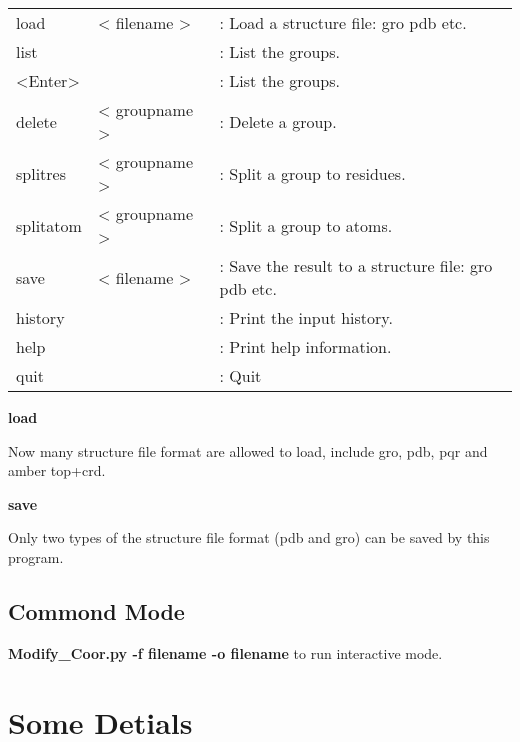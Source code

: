 \documentclass[letterpaper,10pt,english]{sphinxmanual}
\begin{document}
\begin{tabulary}{\linewidth}{|L|L|L|}
\hline

load
 & 
\textless{} filename \textgreater{}
 & 
: Load a structure file: gro pdb etc.
\\

list
 &  & 
: List the groups.
\\

\textless{}Enter\textgreater{}
 &  & 
: List the groups.
\\

delete
 & 
\textless{} groupname \textgreater{}
 & 
: Delete a group.
\\

splitres
 & 
\textless{} groupname \textgreater{}
 & 
: Split a group to residues.
\\

splitatom
 & 
\textless{} groupname \textgreater{}
 & 
: Split a group to atoms.
\\

save
 & 
\textless{} filename \textgreater{}
 & 
: Save the result to a structure file: gro pdb etc.
\\

history
 &  & 
: Print the input history.
\\

help
 &  & 
: Print help information.
\\

quit
 &  & 
: Quit
\\
\hline
\end{tabulary}


\textbf{load}

Now many structure file format are allowed to load, include gro, pdb, pqr and amber top+crd.

\textbf{save}

Only two types of the structure file format (pdb and gro) can be saved by this program.


\subsection{Commond Mode}
\label{documentation_pages/Modify_Coor:commond-mode}
\textbf{Modify\_Coor.py -f filename -o filename} to run interactive mode.


\section{Some Detials}
\label{documentation_pages/Modify_Coor:some-detials}
\end{document}
